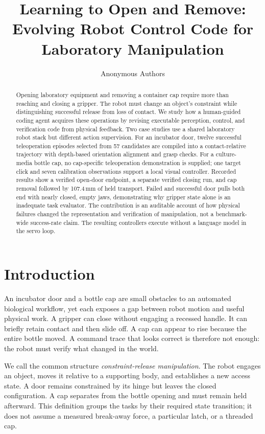 
\title{Learning to Open and Remove:\\Evolving Robot Control Code for Laboratory Manipulation}
\author{Anonymous Authors}
\maketitle
\thispagestyle{empty}\pagestyle{empty}
\begin{abstract}
Opening laboratory equipment and removing a container cap require more than
reaching and closing a gripper. The robot must change an object's constraint
while distinguishing successful release from loss of contact. We study how a
human-guided coding agent acquires these operations by revising executable
perception, control, and verification code from physical feedback. Two case
studies use a shared laboratory robot stack but different action supervision.
For an incubator door, twelve successful teleoperation episodes selected from
57 candidates are compiled into a contact-relative trajectory with depth-based
orientation alignment and grasp checks. For a culture-media bottle cap, no
cap-specific teleoperation demonstration is supplied; one target click and
seven calibration observations support a local visual controller. Recorded
results show a verified open-door endpoint, a separate verified closing run,
and cap removal followed by 107.4\,mm of held transport. Failed and successful
door pulls both end with nearly closed, empty jaws, demonstrating why gripper
state alone is an inadequate task evaluator. The contribution is an auditable
account of how physical failures changed the representation and verification
of manipulation, not a benchmark-wide success-rate claim. The resulting
controllers execute without a language model in the servo loop.
\end{abstract}

\section{Introduction}
An incubator door and a bottle cap are small obstacles to an automated
biological workflow, yet each exposes a gap between robot motion and useful
physical work. A gripper can close without engaging a recessed handle. It can
briefly retain contact and then slide off. A cap can appear to rise because
the entire bottle moved. A command trace that looks correct is therefore not
enough: the robot must verify what changed in the world.

We call the common structure \emph{constraint-release manipulation}. The
robot engages an object, moves it relative to a supporting body, and establishes
a new access state. A door remains constrained by its hinge but leaves the
closed configuration. A cap separates from the bottle opening and must remain
held afterward. This definition groups the tasks by their required state
transition; it does not assume a measured break-away force, a particular latch,
or a threaded cap.

